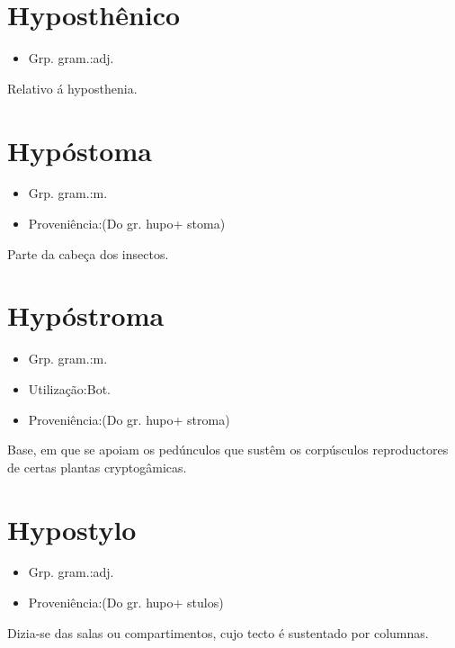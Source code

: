 \documentclass{article}
\begin{document}
\section{Hyposthênico}
\begin{itemize}
\item {Grp. gram.:adj.}
\end{itemize}
Relativo á hyposthenia.
\section{Hypóstoma}
\begin{itemize}
\item {Grp. gram.:m.}
\end{itemize}
\begin{itemize}
\item {Proveniência:(Do gr. \textunderscore hupo\textunderscore  + \textunderscore stoma\textunderscore )}
\end{itemize}
Parte da cabeça dos insectos.
\section{Hypóstroma}
\begin{itemize}
\item {Grp. gram.:m.}
\end{itemize}
\begin{itemize}
\item {Utilização:Bot.}
\end{itemize}
\begin{itemize}
\item {Proveniência:(Do gr. \textunderscore hupo\textunderscore  + \textunderscore stroma\textunderscore )}
\end{itemize}
Base, em que se apoiam os pedúnculos que sustêm os corpúsculos reproductores de certas plantas cryptogâmicas.
\section{Hypostylo}
\begin{itemize}
\item {Grp. gram.:adj.}
\end{itemize}
\begin{itemize}
\item {Proveniência:(Do gr. \textunderscore hupo\textunderscore  + \textunderscore stulos\textunderscore )}
\end{itemize}
Dizia-se das salas ou compartimentos, cujo tecto é sustentado por columnas.
\end{document}
